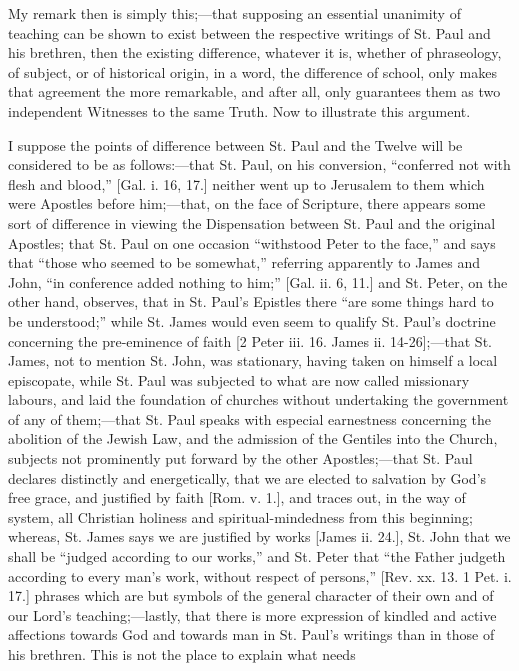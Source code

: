 My remark then is simply this;—that supposing an essential
unanimity of teaching can be shown to exist between the respective
writings of St. Paul and his brethren, then the existing difference,
whatever it is, whether of phraseology, of subject, or of historical
origin, in a word, the difference of school, only makes that agreement
the more remarkable, and after all, only guarantees them as two
independent Witnesses to the same Truth. Now to illustrate this
argument.

I suppose the points of difference between St. Paul and the Twelve
will be considered to be as follows:—that St. Paul, on his conversion,
``conferred not with flesh and blood,'' [Gal. i. 16, 17.]
neither went up to Jerusalem to them which were Apostles before him;—that,
on the face of Scripture, there appears some sort of difference in
viewing the Dispensation between St. Paul and the original Apostles;
that St. Paul on one occasion ``withstood Peter to the face,''
and says that ``those who seemed to be somewhat,'' referring
apparently to James and John, ``in conference added nothing to
him;'' [Gal. ii. 6, 11.] and St. Peter, on the other hand, observes,
that in St. Paul's Epistles there ``are some things hard to be
understood;'' while St. James would even seem to qualify St. Paul's
doctrine concerning the pre-eminence of faith [2 Peter iii. 16. James
ii. 14-26];—that St. James, not to mention St. John, was stationary,
having taken on himself a local episcopate, while St. Paul was subjected
to what are now called missionary labours, and laid the foundation of
churches without undertaking the government of any of them;—that St.
Paul speaks with especial earnestness concerning the abolition of the
Jewish Law, and the admission of the Gentiles into the Church, subjects
not prominently put forward by the other Apostles;—that St. Paul
declares distinctly and energetically, that we are elected to salvation
by God's free grace, and justified by faith [Rom. v. 1.], and traces
out, in the way of system, all Christian holiness and
spiritual-mindedness from this beginning; whereas, St. James says we are
justified by works [James ii. 24.], St. John that we shall be
``judged according to our works,'' and St. Peter that ``the
Father judgeth according to every man's work, without respect of
persons,'' [Rev. xx. 13. 1 Pet. i. 17.] phrases which are but
symbols of the general character of their own and of our Lord's
teaching;—lastly, that there is more expression of kindled and active
affections towards God and towards man in St. Paul's writings than in
those of his brethren. This is not the place to explain what needs
